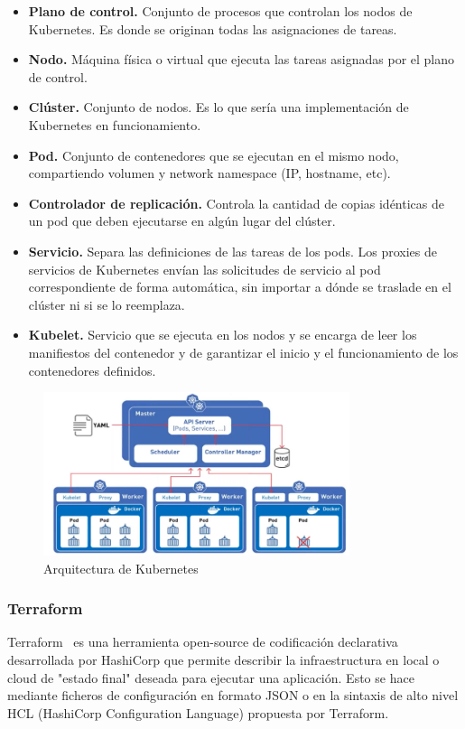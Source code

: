	\begin{itemize}
		\item \textbf{Plano de control.} Conjunto de procesos que controlan los nodos de Kubernetes. Es donde se originan todas las asignaciones de tareas.
		\item \textbf{Nodo.} Máquina física o virtual que ejecuta las tareas asignadas por el plano de control.
		\item \textbf{Clúster.} Conjunto de nodos. Es lo que sería una implementación de Kubernetes en funcionamiento.
		\item \textbf{Pod.} Conjunto de contenedores que se ejecutan en el mismo nodo, compartiendo volumen y network namespace (IP, hostname, etc).
		\item \textbf{Controlador de replicación.} Controla la cantidad de copias idénticas de un pod que deben ejecutarse en algún lugar del clúster.
		\item \textbf{Servicio.} Separa las definiciones de las tareas de los pods. Los proxies de servicios de Kubernetes envían las solicitudes de servicio al pod correspondiente de forma automática, sin importar a dónde se traslade en el clúster ni si se lo reemplaza.
		\item \textbf{Kubelet.} Servicio que se ejecuta en los nodos y se encarga de leer los manifiestos del contenedor y de garantizar el inicio y el funcionamiento de los contenedores definidos.
	\end{itemize}

	\begin{figure}[h]
	\centering
	\includegraphics[width=0.8\textwidth]{../imgs/EdA/k8s-arch.png}
	\caption{Arquitectura de Kubernetes}
	\label{fig:k8s}
	\end{figure}

\subsubsection{Terraform}
	Terraform~\cite{orq4} es una herramienta open-source de codificación declarativa desarrollada por HashiCorp que permite describir la infraestructura en local o cloud de "estado final" deseada para ejecutar una aplicación. Esto se hace mediante ficheros de configuración en formato JSON o en la sintaxis de alto nivel HCL (HashiCorp Configuration Language) propuesta por Terraform. 

